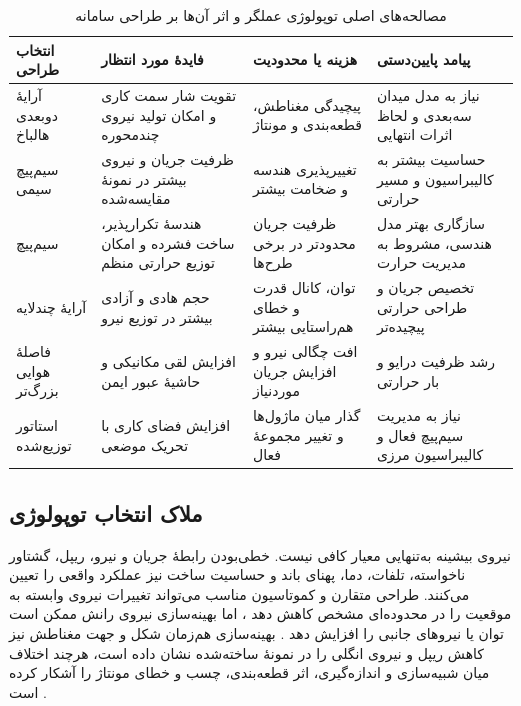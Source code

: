 \begin{table}[htbp]
	\centering
	\caption{مصالحه‌های اصلی توپولوژی عملگر و اثر آن‌ها بر طراحی سامانه}
	\label{tab:actuator-topology-tradeoffs}
	\renewcommand{\arraystretch}{1.28}
	\setlength{\tabcolsep}{3pt}
	\scriptsize
	\begin{tabular}{|p{}|p{}|p{}|p{}|}
		\hline
		\textbf{انتخاب طراحی} & \textbf{فایدهٔ مورد انتظار} & \textbf{هزینه یا محدودیت} & \textbf{پیامد پایین‌دستی} \\
		\hline
		آرایهٔ دوبعدی هالباخ & تقویت شار سمت کاری و امکان تولید نیروی چندمحوره \cite{halbachArtScienceMagnet1995,pengModelingAnalysisNew2012} & پیچیدگی مغناطش، قطعه‌بندی و مونتاژ & نیاز به مدل میدان سه‌بعدی و لحاظ اثرات انتهایی \\
		\hline
		سیم‌پیچ سیمی & ظرفیت جریان و نیروی بیشتر در نمونهٔ مقایسه‌شده \cite{huComparativeAnalysisWireWound2025} & تغییرپذیری هندسه و ضخامت بیشتر & حساسیت بیشتر به کالیبراسیون و مسیر حرارتی \\
		\hline
		سیم‌پیچ \lr{PCB} & هندسهٔ تکرارپذیر، ساخت فشرده و امکان توزیع حرارتی منظم & ظرفیت جریان محدودتر در برخی طرح‌ها & سازگاری بهتر مدل هندسی، مشروط به مدیریت حرارت \\
		\hline
		آرایهٔ چندلایه & حجم هادی و آزادی بیشتر در توزیع نیرو \cite{roversDesignMeasurementsDouble2013} & توان، کانال قدرت و خطای هم‌راستایی بیشتر & تخصیص جریان و طراحی حرارتی پیچیده‌تر \\
		\hline
		فاصلهٔ هوایی بزرگ‌تر & افزایش لقی مکانیکی و حاشیهٔ عبور ایمن & افت چگالی نیرو و افزایش جریان موردنیاز & رشد ظرفیت درایو و بار حرارتی \cite{muDesignOptimizationLargeairgap2025} \\
		\hline
		استاتور توزیع‌شده & افزایش فضای کاری با تحریک موضعی & گذار میان ماژول‌ها و تغییر مجموعهٔ فعال & نیاز به مدیریت سیم‌پیچ فعال و کالیبراسیون مرزی \\
		\hline
	\end{tabular}
\end{table}

\subsection{ملاک انتخاب توپولوژی}
\label{subsec:system_implications_topology}
\label{subsec:actuator_topology_summary}
\label{subsec:mechanical-architecture-summary}
\label{subsec:thermal-materials-summary}

نیروی بیشینه به‌تنهایی معیار کافی نیست. خطی‌بودن رابطهٔ جریان و نیرو، ریپل، گشتاور ناخواسته، تلفات، دما، پهنای باند و حساسیت ساخت نیز عملکرد واقعی را تعیین می‌کنند. طراحی متقارن و کموتاسیون مناسب می‌تواند تغییرات نیروی وابسته به موقعیت را در محدوده‌ای مشخص کاهش دهد \cite{lu6DDirectdriveTechnology2012}، اما بهینه‌سازی نیروی رانش ممکن است توان یا نیروهای جانبی را افزایش دهد \cite{zhangOptimalMatchingDesign2019,liuAnalysisElectromagneticForce2024}. بهینه‌سازی هم‌زمان شکل و جهت مغناطش نیز کاهش ریپل و نیروی انگلی را در نمونهٔ ساخته‌شده نشان داده است، هرچند اختلاف میان شبیه‌سازی و اندازه‌گیری، اثر قطعه‌بندی، چسب و خطای مونتاژ را آشکار کرده است \cite{jiangSimultaneousMagnetizationShape2026}.

